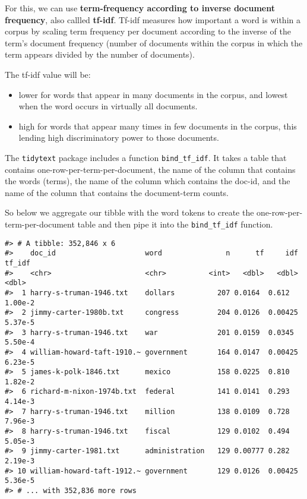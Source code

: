\documentclass[]{book}
\newenvironment{Shaded}{\begin{snugshade}}{\end{snugshade}}
\newcommand{\CommentTok}[1]{\textcolor[rgb]{0.56,0.35,0.01}{\textit{#1}}}
\newcommand{\DataTypeTok}[1]{\textcolor[rgb]{0.13,0.29,0.53}{#1}}
\newcommand{\KeywordTok}[1]{\textcolor[rgb]{0.13,0.29,0.53}{\textbf{#1}}}
\newcommand{\NormalTok}[1]{#1}
\newcommand{\OperatorTok}[1]{\textcolor[rgb]{0.81,0.36,0.00}{\textbf{#1}}}
\newcommand{\OtherTok}[1]{\textcolor[rgb]{0.56,0.35,0.01}{#1}}
\newcommand{\StringTok}[1]{\textcolor[rgb]{0.31,0.60,0.02}{#1}}
\providecommand{\tightlist}{%
  \setlength{\itemsep}{0pt}\setlength{\parskip}{0pt}}
\begin{document}
For this, we can use \textbf{term-frequency according to inverse document frequency}, also callled \textbf{tf-idf}. Tf-idf measures how important a word is within a corpus by scaling term frequency per document according to the inverse of the term's document frequency (number of documents within the corpus in which the term appears divided by the number of documents).

The tf-idf value will be:

\begin{itemize}
\tightlist
\item
  lower for words that appear in many documents in the corpus, and lowest when the word occurs in virtually all documents.
\item
  high for words that appear many times in few documents in the corpus, this lending high discriminatory power to those documents.
\end{itemize}

The \texttt{tidytext} package includes a function \texttt{bind\_tf\_idf}. It takes a table that contains one-row-per-term-per-document, the name of the column that contains the words (terms), the name of the column which contains the doc-id, and the name of the column that contains the document-term counts.

So below we aggregate our tibble with the word tokens to create the one-row-per-term-per-document table and then pipe it into the \texttt{bind\_tf\_idf} function.

\begin{Shaded}
\end{Shaded}

\begin{verbatim}
#> # A tibble: 352,846 x 6
#>    doc_id                     word               n      tf     idf   tf_idf
#>    <chr>                      <chr>          <int>   <dbl>   <dbl>    <dbl>
#>  1 harry-s-truman-1946.txt    dollars          207 0.0164  0.612    1.00e-2
#>  2 jimmy-carter-1980b.txt     congress         204 0.0126  0.00425  5.37e-5
#>  3 harry-s-truman-1946.txt    war              201 0.0159  0.0345   5.50e-4
#>  4 william-howard-taft-1910.~ government       164 0.0147  0.00425  6.23e-5
#>  5 james-k-polk-1846.txt      mexico           158 0.0225  0.810    1.82e-2
#>  6 richard-m-nixon-1974b.txt  federal          141 0.0141  0.293    4.14e-3
#>  7 harry-s-truman-1946.txt    million          138 0.0109  0.728    7.96e-3
#>  8 harry-s-truman-1946.txt    fiscal           129 0.0102  0.494    5.05e-3
#>  9 jimmy-carter-1981.txt      administration   129 0.00777 0.282    2.19e-3
#> 10 william-howard-taft-1912.~ government       129 0.0126  0.00425  5.36e-5
#> # ... with 352,836 more rows
\end{verbatim}
\end{document}
